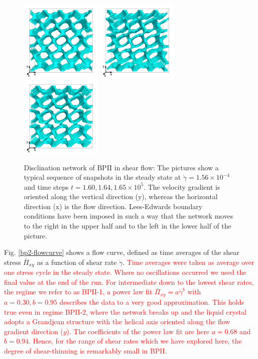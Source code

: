 \documentclass[8.5pt,twoside,twocolumn]{article}
\newcommand{\e}[1]{\times10^{#1}}
\newcommand{\gd}{\dot{\gamma}}
\newcommand{\rev}[1]{{\textcolor{red}{#1}}}
\begin{document}
\begin{figure}[htpb]
\center
\includegraphics[width=0.35\textwidth]{disc-160k_run902r.png}
\includegraphics[width=0.35\textwidth]{disc-164k_run902r.png}
\includegraphics[width=0.35\textwidth]{disc-165k_run902r.png}
\caption{Disclination network of BPII in shear flow: 
The pictures show a typical sequence of snapshots in the steady state 
at $\gd=1.56\e{-4}$ and time steps $t=1.60, 1.64,1.65\e{5}$. The velocity 
gradient is oriented along the vertical direction (y), whereas the 
horizontal direction (x) is the flow direction. Lees-Edwards boundary 
conditions have been imposed in such a way that the network moves to the 
right in the upper half and to the left in the lower half of the picture.}
\label{bp2-1-disc}
\end{figure}

Fig. \ref{bp2-flowcurve} shows a flow curve, defined as time averages of 
the shear stress $\bar{\Pi}_{xy}$ as a function of shear rate $\gd$.
\rev{
Time averages were taken as average over one stress cycle in the steady state.
Where no oscillations occurred we used the final value at the end of the run.
For intermediate down to the lowest shear rates, the regime we refer to as BPII-1, a 
power law fit $\bar{\Pi}_{xy}=a \gd^b$ with $a=0.30, b=0.95$ describes 
the data to a very good approximation.
This holds true even in regime BPII-2, where the network breaks up and 
the liquid crystal adopts a Grandjean structure with the helical axis oriented along the
flow gradient direction ($y$). The coefficients of the power law fit are
here $a=0.68$ and $b=0.94$. Hence, for the range of shear rates which we have explored here, 
the degree of shear-thinning is remarkably small in BPII.
}
\end{document}
